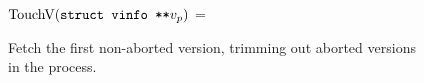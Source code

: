 \documentclass[11pt,notitlepage]{article}
\newcommand{\codesize}{\scriptsize}
\begin{document}
\begin{figure}
$\text{TouchV}(\texttt{struct vinfo **} v_p)$ =
\begin{myalgorithmic}
\STATE
\end{myalgorithmic}
\caption{Fetch the first non-aborted version, trimming out aborted
         versions in the process.}
\label{fig:touchv}
\end{figure}




\end{document}
